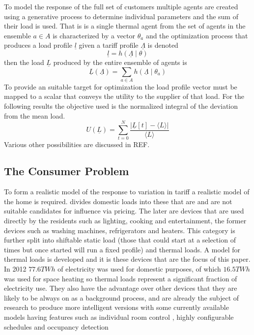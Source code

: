 \documentclass[a4paper, 10 pt, conference]{ieeeconf}  %
\begin{document}
To model the response of the full set of customers multiple agents are created using a generative process to determine individual parameters and the sum of their load is used. That is is a single thermal agent from the set of agents in the ensemble $a \in A$ is characterized by a vector $\theta_{a}$ and the optimization process that produces a load profile $\underline{l}$ given a tariff profile $\underline{\Lambda}$ is denoted
\begin{equation}
\underline{l}=h(\underline{\Lambda} \mid \theta)
\end{equation}
then the load $\underline{L}$ produced by the entire ensemble of agents is
\begin{equation}
\underline{L}(\underline{\Lambda}) = \sum_{a \in A} h(\underline{\Lambda} \mid \theta_{a})
\end{equation}
To provide an suitable target for optimization the load profile vector must be mapped to a scalar that conveys the utility to the supplier of that load. For the following results the objective used is the normalized integral of the deviation from the mean load.
\begin{equation}
U(\underline{L})=\sum_{t=0}^{N} \frac{\left| \underline{L}[t]-\langle L \rangle \right|}{\langle L \rangle}
\end{equation}
Various other possibilities are discussed in REF.

\subsection{The Consumer Problem}
To form a realistic model of the response to variation in tariff a realistic model of the home is required. \cite{ramchurn2011agent} divides domestic loads into these that are and are not suitable candidates for influence via pricing. The later are devices that are used directly by the residents such as lighting, cooking and entertainment, the former devices such as washing machines, refrigerators and heaters. This category is further split into shiftable static load (those that could start at a selection of times but once started will run a fixed profile) and thermal loads. A model for thermal loads is developed and it is these devices that are the focus of this paper. In 2012 $77.6 TWh$ of electricity was used for domestic purposes, of which $16.5 TWh$ was used for space heating \cite{ecuk_data} so thermal loads represent a significant fraction of electricity use. They also have the advantage over other devices that they are likely to be always on as a background process, and are already the subject of research to produce more intelligent versions \cite{rogers2011adaptive} \cite{ramchurn2013agentswitch} with some currently available models having features such as individual room control \cite{honeywell}, highly configurable schedules \cite{nest} and occupancy detection \cite{tado}
\end{document}
